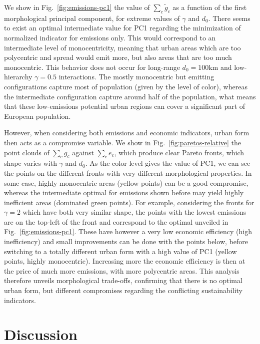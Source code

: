 \documentclass{article}
\begin{document}
We show in Fig.~\ref{fig:emissions-pc1} the value of $\sum_c \tilde{g}_c$ as a function of the first morphological principal component, for extreme values of $\gamma$ and $d_0$. There seems to exist an optimal intermediate value for PC1 regarding the minimization of normalized indicator for emissions only. This would correspond to an intermediate level of monocentricity, meaning that urban areas which are too polycentric and spread would emit more, but also areas that are too much monocentric. This behavior does not occur for long-range $d_0 = 100$km and low-hierarchy $\gamma=0.5$ interactions. The mostly monocentric but emitting configurations capture most of population (given by the level of color), whereas the intermediate configuration capture around half of the population, what means that these low-emissions potential urban regions can cover a significant part of European population.


However, when considering both emissions and economic indicators, urban form then acts as a compromise variable. We show in Fig.~\ref{fig:paretos-relative} the point clouds of $\sum_c g_c$ against $\sum_c e_c$, which produce clear Pareto fronts, which shape varies with $\gamma$ and $d_0$. As the color level gives the value of PC1, we can see the points on the different fronts with very different morphological properties. In some case, highly monocentric areas (yellow points) can be a good compromise, whereas the intermediate optimal for emissions shown before may yield highly inefficient areas (dominated green points). For example, considering the fronts for $\gamma = 2$ which have both very similar shape, the points with the lowest emissions are on the top-left of the front and correspond to the optimal unveiled in Fig.~\ref{fig:emissions-pc1}. These have however a very low economic efficiency (high inefficiency) and small improvements can be done with the points below, before switching to a totally different urban form with a high value of PC1 (yellow points, highly monocentric). Increasing more the economic efficiency is then at the price of much more emissions, with more polycentric areas. This analysis therefore unveils morphological trade-offs, confirming that there is no optimal urban form, but different compromises regarding the conflicting sustainability indicators.



\section{Discussion}
\end{document}
